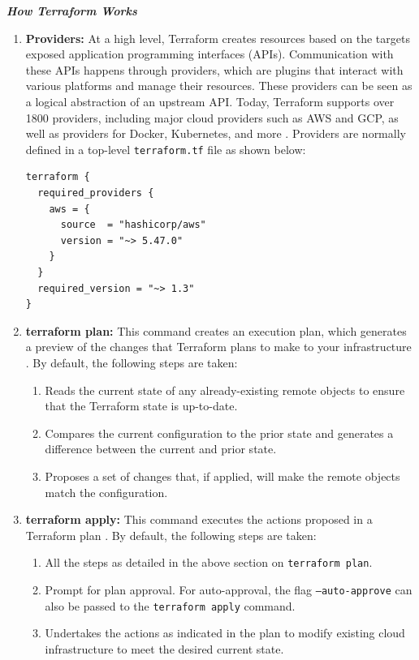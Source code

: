 \textbf{\textit{How Terraform Works}}
\vspace{-1em}
\begin{enumerate}
    \item \textbf{Providers:} At a high level, Terraform creates resources based on the targets exposed application programming interfaces (APIs). Communication with these APIs happens through providers, which are plugins that interact with various platforms and manage their resources. These providers can be seen as a logical abstraction of an upstream API. Today, Terraform supports over 1800 providers, including major cloud providers such as AWS and GCP, as well as providers for Docker, Kubernetes, and more \cite{cvitkovic-2022}. Providers are normally defined in a top-level \texttt{terraform.tf} file as shown below:
    \begin{verbatim}
terraform {
  required_providers {
    aws = {
      source  = "hashicorp/aws"
      version = "~> 5.47.0"
    }
  }
  required_version = "~> 1.3"
}
    \end{verbatim}
    \item \textbf{terraform plan:} This command creates an execution plan, which generates a preview of the changes that Terraform plans to make to your infrastructure \cite{hashicorp}. By default, the following steps are taken:
    \begin{enumerate}
        \item Reads the current state of any already-existing remote objects to ensure that the Terraform state is up-to-date.
        \item Compares the current configuration to the prior state and generates a difference between the current and prior state.
        \item Proposes a set of changes that, if applied, will make the remote objects match the configuration.
    \end{enumerate}
    \item \textbf{terraform apply:} This command executes the actions proposed in a Terraform plan \cite{hashicorp}. By default, the following steps are taken:
    \begin{enumerate}
        \item All the steps as detailed in the above section on \texttt{terraform plan}.
        \item Prompt for plan approval. For auto-approval, the flag \texttt{--auto-approve} can also be passed to the \texttt{terraform apply} command.
        \item Undertakes the actions as indicated in the plan to modify existing cloud infrastructure to meet the desired current state.

\end{enumerate}
\end{enumerate}
